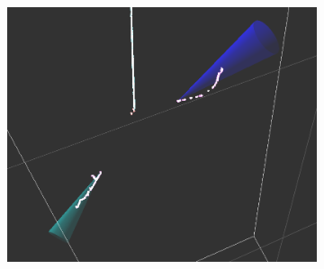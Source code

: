 \begin{figure}[htbp]
\begin{center}
\begin{subfigure}{0.45\textwidth}
\includegraphics[width=0.95\linewidth]{figs/datapi0/evd/Run6058Subrun177Evt8877.png}
\caption{}
\end{subfigure}
\begin{subfigure}{0.45\textwidth}

\end{subfigure}
\end{center}
\end{figure}
